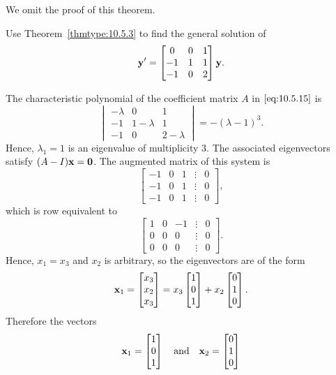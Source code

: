 \documentclass{ximera}
\begin{document}
We omit the proof of this theorem.

\begin{example}\label{example:10.5.5}
Use Theorem~\ref{thmtype:10.5.3} to find the general solution of
\begin{equation}\label{eq:10.5.15}
{\bf y}'=\begin{bmatrix}0&0&1\\-1&1&1\\-1&0&2\end{bmatrix}{\bf y}.
\end{equation}


\begin{explanation}  The characteristic polynomial of
the coefficient matrix $A$ in  $\eqref{eq:10.5.15}$ is
$$
\begin{vmatrix}-\lambda & 0 & 1\\ -1 & 1-\lambda &
1\\ -1 & 0 & 2-\lambda\end{vmatrix}=-(\lambda-1)^3.
$$
Hence,  $\lambda_1=1$ is
an eigenvalue of multiplicity $3$.  The associated eigenvectors
satisfy $(A-I){\bf x=0}$. The  augmented
matrix of this system is
$$
\begin{bmatrix} -1 & 0 & 1 &\vdots & 0\\
-1& 0 & 1 &\vdots & 0\\ -1 & 0 & 1 &
\vdots & 0\end{bmatrix},
 $$
which is row equivalent to
$$
\begin{bmatrix} 1 & 0 &- 1 &\vdots& 0\\ 0 & 0 & 0  &\vdots& 0
\\ 0 & 0 & 0 &\vdots&0\end{bmatrix}.
$$
Hence, $x_1 =x_3$ and  $x_2$ is arbitrary, so the eigenvectors are  of
the form
$$
{\bf x}_1=\begin{bmatrix}x_3\\x_2\\x_3\end{bmatrix}=x_3\begin{bmatrix}1\\0\\1\end{bmatrix}+x_2\begin{bmatrix}0\\1\\0\end{bmatrix}.
$$
Therefore the vectors
\begin{equation}\label{eq:10.5.16}
{\bf x}_1  =\begin{bmatrix}1\\0\\1\end{bmatrix}\quad\mbox{and}\quad {\bf x}_2=\begin{bmatrix}0\\1\\0\end{bmatrix}

\end{equation}
\end{explanation}
\end{example}
\end{document}
